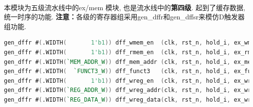\documentclass[lang=cn,11pt,a4paper,chinesefont=founder]{elegantpaper}
\begin{document}
\\
本模块为五级流水线中的ex/mem 模块, 也是流水线中的\textbf{第四级}. 起到了缓存数据, 统一时序的功能. 
\textbf{注意：}各级的寄存器组采用gen\_dffr和gen\_dffsr来模仿D触发器组功能. 
\begin{lstlisting}[language=verilog]
gen_dffr #(.WIDTH(       1'b1)) dff_wmem_en  (clk, rst_n, hold_i, ex_wmem_en_i, mem_wmem_en_o);
gen_dffr #(.WIDTH(       1'b1)) dff_rmem_en  (clk, rst_n, hold_i, ex_rmem_en_i, mem_rmem_en_o);
gen_dffr #(.WIDTH(`MEM_ADDR_W)) dff_mem_addr (clk, rst_n, hold_i, ex_mem_addr_i, mem_mem_addr_o);
gen_dffr #(.WIDTH(  `FUNCT3_W)) dff_funct3   (clk, rst_n, hold_i, ex_funct3_i, mem_funct3_o);
gen_dffr #(.WIDTH(       1'b1)) dff_wreg_en  (clk, rst_n, hold_i, ex_wreg_en_i, mem_wreg_en_o);
gen_dffr #(.WIDTH(`REG_ADDR_W)) dff_wreg_addr(clk, rst_n, hold_i, ex_wreg_addr_i, mem_wreg_addr_o);
gen_dffr #(.WIDTH(`REG_DATA_W)) dff_wreg_data(clk, rst_n, hold_i, ex_wreg_data_i, mem_wreg_data_o);
\end{lstlisting}
\end{document}
